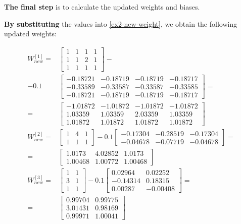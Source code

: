 \documentclass[12pt]{article}
\begin{document}
\begin{enumerate}[leftmargin=\labelsep]
          \textbf{The final step} is to calculate the updated weights and biases.

          \textbf{By substituting} the values into \eqref{ex2-new-weight}, we obtain the following updated weights:

          \vskip -0.2cm
          \begin{align*}
              W^{[1]}_{new} = & \begin{bmatrix} 1 & 1 & 1 & 1 \\ 1 & 1 & 2 & 1 \\ 1 & 1 & 1 & 1\end{bmatrix} -\\
                - 0.1 & \begin{bmatrix} -0.18721 & -0.18719 & -0.18719 & -0.18717 \\ -0.33589 & -0.33587 & -0.33587 & -0.33585 \\ -0.18721 & -0.18719 & -0.18719 & -0.18717 \end{bmatrix} = \\
                = & \begin{bmatrix} -1.01872 & -1.01872 & -1.01872 & -1.01872 \\ 1.03359 & 1.03359 & 2.03359 & 1.03359 \\ 1.01872 & 1.01872 & 1.01872 & 1.01872 \end{bmatrix} \\
              W^{[2]}_{new} = & \begin{bmatrix} 1 & 4 & 1 \\ 1 & 1 & 1 \end{bmatrix} -
                0.1 \begin{bmatrix} -0.17304 & -0.28519 & -0.17304\\ -0.04678 & -0.07719 & -0.04678 \end{bmatrix} = \\
                = & \begin{bmatrix} 1.0173 & 4.02852 & 1.0173 \\ 1.00468 & 1.00772 & 1.00468\end{bmatrix} \\
              W^{[3]}_{new} = & \begin{bmatrix} 1 & 1 \\ 3 & 1 \\ 1 & 1 \end{bmatrix} -
                0.1 \begin{bmatrix}  0.02964 & 0.02252 \\ -0.14314 & 0.18315 \\ 0.00287 & -0.00408 \end{bmatrix} = \\
                = & \begin{bmatrix} 0.99704 & 0.99775 \\ 3.01431 & 0.98169 \\ 0.99971 & 1.00041\end{bmatrix}
          \end{align*}


\end{enumerate}
\end{document}
